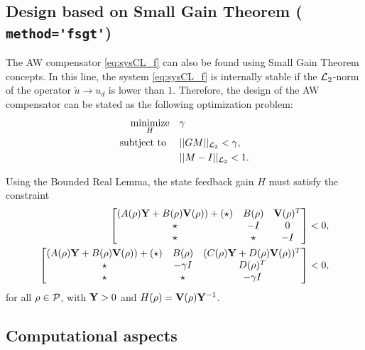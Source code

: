 \documentclass[fleqn,11pt]{article}
\newcommand{\lcode}[1]{\textbf{%
    \lstinline[style=mystyle]{#1}}}
\begin{document}
\subsection{Design based on Small Gain Theorem (\lcode{method='fsgt'})}\label{sec:fsgt}

The AW compensator \cref{eq:sysCL_f} can also be found using Small Gain Theorem concepts. In this line, the system \cref{eq:sysCL_f} is internally stable if the $\mathcal{L}_2$-norm of the operator $\check{u}\to u_d$ is lower than $1$. Therefore, the design of the AW compensator can be stated as the following optimization problem:
\begin{align}
    \underset{H}{\text{minimize}}
       &\quad \gamma \label{eq:fsgt_1}\\
    \text{subtject to }&\quad ||GM||_{\mathcal{L}_2}  < \gamma, \\
                       &\quad ||M-I||_{\mathcal{L}_2} < 1 \label{eq:fsgt_3}.
\end{align}

Using the Bounded Real Lemma, the state feedback gain $H$ must satisfy the constraint
\begin{align}
    \begin{bmatrix}
    (A(\rho)\mathbf{Y}+B(\rho)\mathbf{V}(\rho))+(\star) & B(\rho) & \mathbf{V}(\rho)^T \\
    \star & -I & 0\\
    \star & \star & -I
    \end{bmatrix}&<0,\label{eq:lmi_FSGT_1}\\
    \begin{bmatrix}
    (A(\rho)\mathbf{Y}+B(\rho)\mathbf{V}(\rho))+(\star) & B(\rho) & (C(\rho)\mathbf{Y}+D(\rho)\mathbf{V}(\rho))^T\\
    \star & -\gamma I & D(\rho)^T\\
    \star & \star & -\gamma I
    \end{bmatrix}&<0,\label{eq:lmi_FSGT_2}
\end{align}
for all $\rho\in\mathcal{P}$, with $\mathbf{Y}>0$ and $H(\rho)=\mathbf{V}(\rho)\mathbf{Y}^{-1}$.



\subsection{Computational aspects}\label{sec:fcomp}
\end{document}
